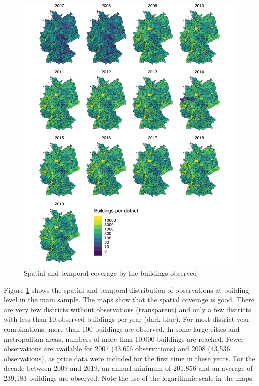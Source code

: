 \documentclass[12pt,twoside]{reedthesis}
\begin{document}
\singlespacing
\newpage
\begin{figure}

{\centering \includegraphics[width=0.77\linewidth]{figure/buildings_distribution} 

}

\caption{Spatial and temporal coverage by the buildings observed}\label{fig:buildings-distribution}
\end{figure}
\noindent
Figure \ref{fig:buildings-distribution} shows the spatial and temporal distribution of observations at building-level in the main sample. The maps show that the spatial coverage is good. There are very few districts without observations (transparent) and only a few districts with less than 10 observed buildings per year (dark blue). For most district-year combinations, more than 100 buildings are observed. In some large cities and metropolitan areas, numbers of more than 10,000 buildings are reached. Fewer observations are available for 2007 (43,696 observations) and 2008 (43,536 observations), as price data were included for the first time in these years. For the decade between 2009 and 2019, an annual minimum of 201,856 and an average of 239,183 buildings are observed. Note the use of the logarithmic scale in the maps.
\end{document}

